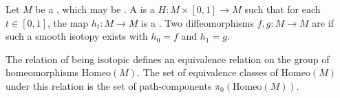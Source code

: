 \begin{definition} \label{definition:smooth_isotopy_on_a_smooth_manifold_between_diffeomorphisms_on_a_smooth_manifold}
Let $M$ be a , which may be . A  is a  $H: M \times [0, 1] \to M$ such that for each $t \in [0, 1]$, the map $h_t: M \to M$ is a . Two diffeomorphisms $f, g: M \to M$ are  if such a smooth isotopy exists with $h_0 = f$ and $h_1 = g$.

The relation of being isotopic defines an equivalence relation on the group of homeomorphisms $\text{Homeo}(M)$. The set of equivalence classes of $\text{Homeo}(M)$ under this relation is the set of path-components $\pi_0(\text{Homeo}(M))$.
\end{definition}